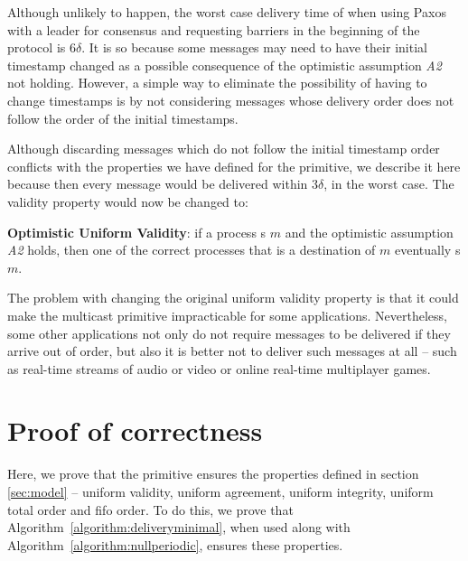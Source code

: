 \documentclass[times, 10pt]{article}
\begin{document}
Although unlikely to happen, the worst case delivery time of \amcast{} when using Paxos with a leader for consensus and requesting barriers in the beginning of the protocol is $6\delta$. It is so because some messages may need to have their initial timestamp changed as a possible consequence of the optimistic assumption \emph{A2} not holding. However, a simple way to eliminate the possibility of having to change timestamps is by not considering messages whose delivery order does not follow the order of the initial timestamps.

Although discarding messages which do not follow the initial timestamp order conflicts with the properties we have defined for the \amcast{} primitive, we describe it here because then every message would be delivered within $3\delta$, in the worst case. The validity property would now be changed to:

\textbf{Optimistic Uniform Validity}: if a process \amcast{}s $m$ and the optimistic assumption \emph{A2} holds, then one of the correct processes that is a destination of $m$ eventually \cons{}s $m$.

The problem with changing the original uniform validity property is that it could make the multicast primitive impracticable for some applications. Nevertheless, some other applications not only do not require messages to be delivered if they arrive out of order, but also it is better not to deliver such messages at all -- such as real-time streams of audio or video or online real-time multiplayer games.






\section{Proof of correctness}
\label{sec:proofs}

Here, we prove that the \amcast{} primitive ensures the properties defined in section \ref{sec:model} -- uniform validity, uniform agreement, uniform integrity, uniform total order and fifo order. To do this, we prove that \mbox{Algorithm \ref{algorithm:deliveryminimal}}, when used along with \mbox{Algorithm \ref{algorithm:nullperiodic}}, ensures these properties.
\end{document}
